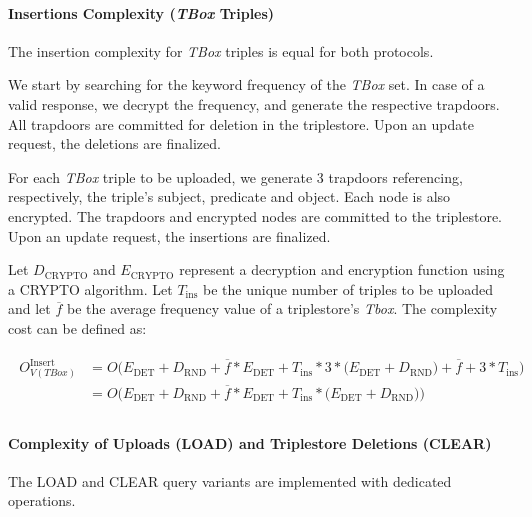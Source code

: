 \paragraph{Insertions Complexity (\emph{TBox} Triples)}

The insertion complexity for \emph{TBox} triples is equal for both protocols. 

We start by searching for the keyword frequency of the \emph{TBox} set. In case of a valid response, we decrypt the frequency, and generate the respective trapdoors. All trapdoors are committed for deletion in the triplestore. Upon an update request, the deletions are finalized.

For each \emph{TBox} triple to be uploaded, we generate 3 trapdoors referencing, respectively, the triple's subject, predicate and object. Each node is also encrypted. The trapdoors and encrypted nodes are committed to the triplestore. Upon an update request, the insertions are finalized. 

Let $D_{\text{CRYPTO}}$ and $E_{\text{CRYPTO}}$ represent a decryption and encryption function using a CRYPTO algorithm. Let $T_{\text{ins}}$ be the unique number of triples to be uploaded and let $\overline{f}$ be the average frequency value of a triplestore's \emph{Tbox}. The complexity cost can be defined as:

\begin{align}
    \label{equation:update-insert-tbox}
    \begin{split}
        O^{\text{Insert}}_{V (TBox)} &=
        O\Big(
            E_{\text{DET}} + D_{\text{RND}} + \overline{f} * E_{\text{DET}}
            + T_{\text{ins}} * 3 * \big( E_{\text{DET}} + D_{\text{RND}} \big)
            + \overline{f} + 3 * T_{\text{ins}}           
        \Big) \\
        &=
        O\Big(
            E_{\text{DET}} + D_{\text{RND}} + \overline{f} * E_{\text{DET}}
            + T_{\text{ins}} * \big( E_{\text{DET}} + D_{\text{RND}} \big)          
        \Big) \\
    \end{split}
\end{align}

\paragraph{Complexity of Uploads (LOAD) and Triplestore Deletions (CLEAR)}

The LOAD and CLEAR query variants are implemented with dedicated operations.

